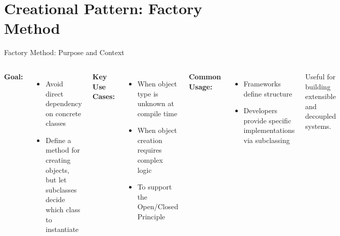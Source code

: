 \documentclass[aspectratio=169, table]{beamer}
\begin{document}
\section{Creational Pattern: Factory Method}

\begin{frame}[fragile]{Factory Method: Purpose and Context}
\vspace{10pt}
\begin{columns}[T]
\textbf{Goal:}
\begin{itemize}
\item Avoid direct dependency on concrete classes
\item Define a method for creating objects, but let subclasses decide which class to instantiate
\end{itemize}

\textbf{Key Use Cases:}
\begin{itemize}
\item When object type is unknown at compile time
\item When object creation requires complex logic
\item To support the Open/Closed Principle
\end{itemize}

\textbf{Common Usage:}
\begin{itemize}
\item Frameworks define structure
\item Developers provide specific implementations via subclassing
\end{itemize}

\vspace{5pt}
Useful for building extensible and decoupled systems.
\end{columns}
\end{frame}
\end{document}
